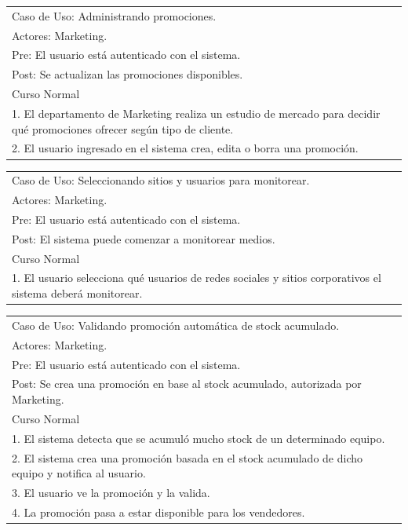 \vspace{1cm}

\begin{tabular}{ | p{14cm} | }
  \hline
  Caso de Uso: Administrando promociones. \\
  Actores: Marketing. \\
  Pre: El usuario está autenticado con el sistema. \\
  Post: Se actualizan las promociones disponibles. \\
  \hline
  Curso Normal\\
  \hline
  1. El departamento de Marketing realiza un estudio de mercado para decidir qué promociones ofrecer según tipo de cliente. \\
  2. El usuario ingresado en el sistema crea, edita o borra una promoción. \\
  \hline
\end{tabular}

\vspace{1cm}

\begin{tabular}{ | p{14cm} | }
  \hline
  Caso de Uso: Seleccionando sitios y usuarios para monitorear. \\
  Actores: Marketing. \\
  Pre: El usuario está autenticado con el sistema. \\
  Post: El sistema puede comenzar a monitorear medios. \\
  \hline
  Curso Normal\\
  \hline
  1. El usuario selecciona qué usuarios de redes sociales y sitios corporativos el sistema deberá monitorear. \\
  \hline
\end{tabular}

\vspace{1cm}

\begin{tabular}{ | p{14cm} | }
  \hline
  Caso de Uso: Validando promoción automática de stock acumulado. \\
  Actores: Marketing. \\
  Pre: El usuario está autenticado con el sistema. \\
  Post: Se crea una promoción en base al stock acumulado, autorizada por Marketing. \\
  \hline
  Curso Normal\\
  \hline
  1. El sistema detecta que se acumuló mucho stock de un determinado equipo. \\
  2. El sistema crea una promoción basada en el stock acumulado de dicho equipo y notifica al usuario. \\
  3. El usuario ve la promoción y la valida. \\
  4. La promoción pasa a estar disponible para los vendedores. \\
  \hline
\end{tabular}

